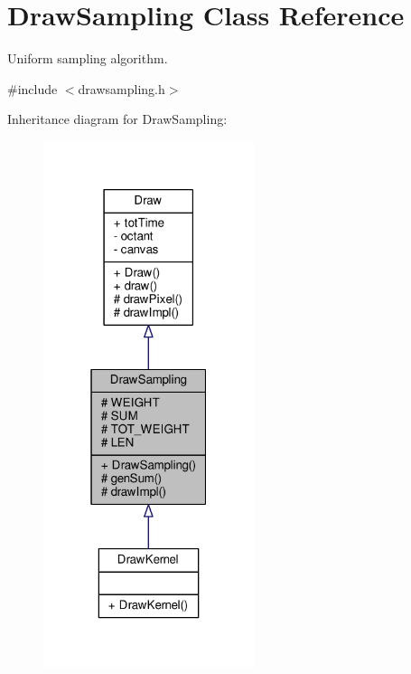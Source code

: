 \hypertarget{classDrawSampling}{}\section{Draw\+Sampling Class Reference}
\label{classDrawSampling}


Uniform sampling algorithm.  




{\ttfamily \#include $<$drawsampling.\+h$>$}



Inheritance diagram for Draw\+Sampling\+:
\nopagebreak
\begin{figure}[H]
\begin{center}
\leavevmode
\includegraphics[width=175pt]{classDrawSampling__inherit__graph}
\end{center}
\end{figure}


